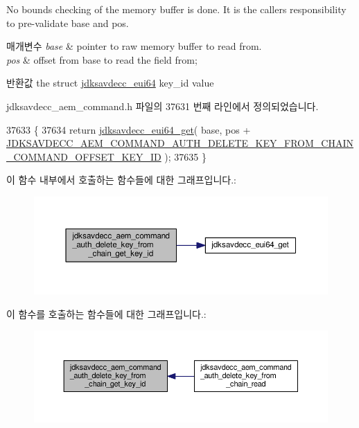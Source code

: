 No bounds checking of the memory buffer is done. It is the caller\textquotesingle{}s responsibility to pre-\/validate base and pos.


\begin{DoxyParams}{매개변수}
{\em base} & pointer to raw memory buffer to read from. \\
\hline
{\em pos} & offset from base to read the field from; \\
\hline
\end{DoxyParams}
\begin{DoxyReturn}{반환값}
the struct \hyperlink{structjdksavdecc__eui64}{jdksavdecc\+\_\+eui64} key\+\_\+id value 
\end{DoxyReturn}


jdksavdecc\+\_\+aem\+\_\+command.\+h 파일의 37631 번째 라인에서 정의되었습니다.


\begin{DoxyCode}
37633 \{
37634     \textcolor{keywordflow}{return} \hyperlink{group__eui64_ga2652311a25a6b91cddbed75c108c7031}{jdksavdecc\_eui64\_get}( base, pos + 
      \hyperlink{group__command__auth__delete__key__from__chain_ga1221dc70bf6f5622aaa7fb2bf110c65e}{JDKSAVDECC\_AEM\_COMMAND\_AUTH\_DELETE\_KEY\_FROM\_CHAIN\_COMMAND\_OFFSET\_KEY\_ID}
       );
37635 \}
\end{DoxyCode}


이 함수 내부에서 호출하는 함수들에 대한 그래프입니다.\+:
\nopagebreak
\begin{figure}[H]
\begin{center}
\leavevmode
\includegraphics[width=350pt]{group__command__auth__delete__key__from__chain_ga00b12cbc1d1695d6a006ba72fa5a9ba2_cgraph}
\end{center}
\end{figure}




이 함수를 호출하는 함수들에 대한 그래프입니다.\+:
\nopagebreak
\begin{figure}[H]
\begin{center}
\leavevmode
\includegraphics[width=350pt]{group__command__auth__delete__key__from__chain_ga00b12cbc1d1695d6a006ba72fa5a9ba2_icgraph}
\end{center}
\end{figure}


